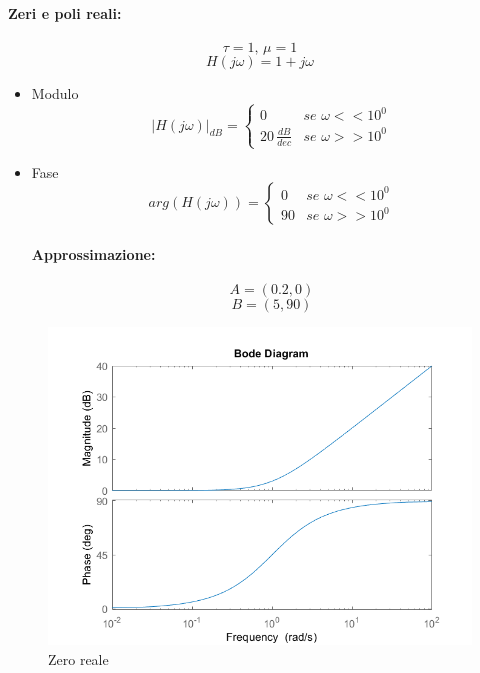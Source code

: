 \documentclass[a4paper,oneside,titlepage]{book}
\begin{document}
\paragraph{Zeri e poli reali:}
\[ \tau = 1, \, \mu = 1 \]
\[ H(j\omega)=1+j\omega \]
\begin{itemize}
	\item Modulo
	\[
	|H(j\omega)|_{dB} =
	\begin{cases}
	0& se \,\, \omega << 10^0 \\
	20 \, \frac{dB}{dec}& se \,\, \omega >> 10^0
	\end{cases}
	\]
	\item Fase
	\[
	arg(H(j\omega)) =
	\begin{cases}
	0& se \,\, \omega << 10^0 \\
	90& se \,\, \omega >> 10^0
	\end{cases}
	\]
	\paragraph{Approssimazione:}
	\[ A = \left( 0.2, 0 \right) \]
	\[ B = \left( 5, 90 \right) \]
\end{itemize}
\newpage
\begin{figure}[htp]
	\centering
	\includegraphics[scale=0.5]{reali.png}
	\caption{Zero reale}
	\label{fig:reali}
\end{figure}
\end{document}
